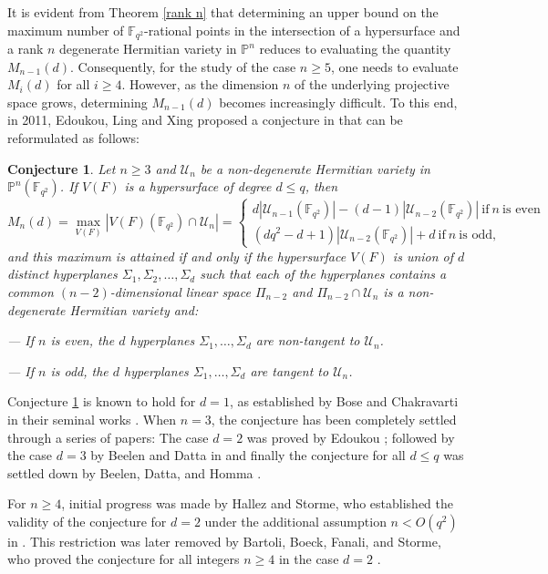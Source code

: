 \documentclass[10pt,a4paper,oneside]{amsproc}
\newtheorem{conjecture}{Conjecture}
\newcommand{\Fqt}{\mathbb{F}_{q^2}}
\newcommand{\U}{\mathcal{U}}
\def\PP{{\mathbb P}}
\begin{document}
It is evident from Theorem \ref{rank n} that determining an upper bound on the maximum number of $\Fqt$-rational points in the intersection of a hypersurface and a rank $n$ degenerate Hermitian variety in $\PP^n$ reduces to evaluating the quantity $M_{n-1}(d)$. Consequently, for the study of the case $n\geq 5$, one needs to evaluate $M_i(d)$ for all $i\geq 4$. However, as the dimension $n$ of the underlying projective space grows, determining $M_{n-1}(d)$ becomes increasingly difficult. To this end, in 2011, Edoukou, Ling and Xing proposed a conjecture in \cite{ELX} that can be reformulated as follows: 
\begin{conjecture}\cite[Conjecture 2 (ii)]{ELX}\label{ELXc}
   Let $n\geq 3$ and $\U_n$ be a non-degenerate Hermitian variety in $\PP^n(\Fqt)$. If $V(F)$ is a hypersurface of degree $d\leq q$, then 
   $$M_n(d)=\max_{V(F)} |V(F)(\Fqt)\cap \U_n|=\begin{cases}
       d|\U_{n-1}(\Fqt)|-(d-1)|\U_{n-2}(\Fqt)| \ \text{if} \ n \ \text{is even}\\
       (dq^2-d+1)|\U_{n-2}(\Fqt)|+d\ \text{if} \ n \ \text{is odd},
   \end{cases}$$ 
   and this maximum is attained if and only if the hypersurface $V(F)$ is union of $d$ distinct hyperplanes $\Sigma_1, \Sigma_2,\dots, \Sigma_d$ such that each of the hyperplanes contains a common $(n-2)$-dimensional linear space $\Pi_{n-2}$  and $\Pi_{n-2}\cap \U_n$ is a non-degenerate Hermitian variety and: 

     --- If $n$ is even, the $d$ hyperplanes $\Sigma_1,\dots, \Sigma_d$ are non-tangent to $\U_n$.

     
     --- If $n$ is odd, the $d$ hyperplanes $\Sigma_1,\dots, \Sigma_d$ are tangent to $\U_n$. 
\end{conjecture}
Conjecture \ref{ELXc} is known to hold for $d=1$, as established by Bose and Chakravarti in their seminal works  \cite{BC, C}. When $n=3$, the conjecture has been completely settled through a series of papers: The case $d=2$ was proved by Edoukou \cite{E}; followed by the case $d=3$ by Beelen and Datta in \cite{BD} and finally the conjecture for all $d\leq q$ was settled down by Beelen, Datta, and Homma \cite{BDH}.

For $n\geq 4$, initial progress was made by Hallez and Storme, who established the validity of the conjecture for $d=2$ under the additional assumption $n < O(q^2)$ in \cite{HS}. This restriction was later removed by Bartoli, Boeck, Fanali, and Storme, who proved the conjecture for all integers $n\geq 4$ in the case $d=2$ \cite[Theorem 3.3]{BBFS}.
\end{document}
